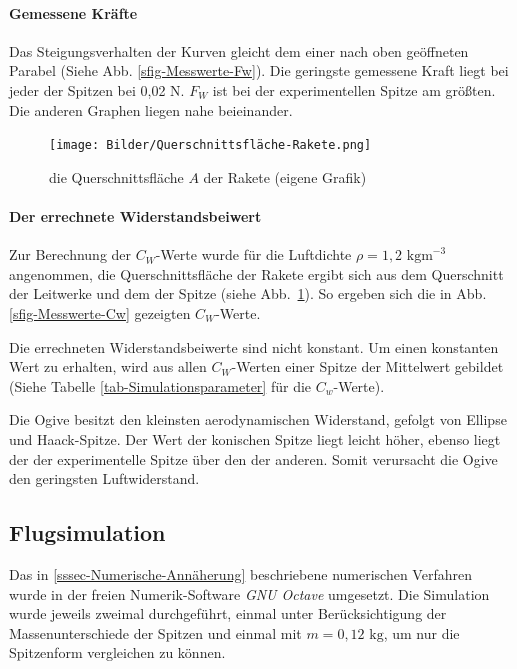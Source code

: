\documentclass[10pt,a4paper]{article}
\begin{document}
\paragraph{Gemessene Kräfte}
Das Steigungsverhalten der Kurven gleicht dem einer nach oben geöffneten Parabel (Siehe Abb. \ref{sfig-Messwerte-Fw}). Die geringste gemessene Kraft liegt bei jeder der Spitzen bei 0,02 N. $F_{W}$ ist bei der experimentellen Spitze am größten. Die anderen Graphen liegen nahe beieinander.

\begin{figure}
	\vspace{-12pt}
	\centering
	\texttt{[image: Bilder/Querschnittsfläche-Rakete.png]}
	\caption{die Querschnittsfläche $A$ der Rakete (eigene Grafik)}
	\label{fig-Querschnittsfläche-Rakete}
	\vspace{-20pt}
\end{figure}

\paragraph{Der errechnete Widerstandsbeiwert}
Zur Berechnung der $C_{W}$-Werte wurde für die Luftdichte ${\rho} = 1,2 \text{ kgm}^{-3}$ angenommen, die Querschnittsfläche der Rakete ergibt sich aus dem Querschnitt der Leitwerke und dem der Spitze (siehe Abb.~\ref{fig-Querschnittsfläche-Rakete}).
So ergeben sich die in Abb. \ref{sfig-Messwerte-Cw} gezeigten $C_{W}$-Werte.

Die errechneten Widerstandsbeiwerte sind nicht konstant. Um einen konstanten Wert zu erhalten, wird aus allen $C_{W}$-Werten einer Spitze der Mittelwert gebildet (Siehe Tabelle \ref{tab-Simulationsparameter} für die $C_{w}$-Werte).

Die Ogive besitzt den kleinsten aerodynamischen Widerstand, gefolgt von Ellipse und Haack-Spitze. Der Wert der konischen Spitze liegt leicht höher, ebenso liegt der der experimentelle Spitze über den der anderen. Somit verursacht die Ogive den geringsten Luftwiderstand. 


\subsection{Flugsimulation}

Das in \ref{sssec-Numerische-Annäherung} beschriebene numerischen Verfahren wurde in der freien Numerik-Software \emph{GNU Octave} umgesetzt. Die Simulation wurde jeweils zweimal durchgeführt, einmal unter Berücksichtigung der Massenunterschiede der Spitzen und einmal mit $m = 0,12 \text{ kg}$, um nur die Spitzenform vergleichen zu können.
\end{document}
